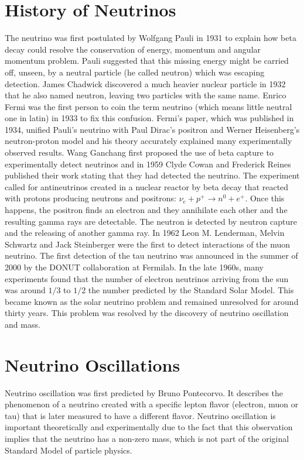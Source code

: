 \section{History of Neutrinos}
The neutrino was first postulated by Wolfgang Pauli in 1931 to explain how beta decay could resolve the conservation of energy, momentum and angular momentum problem. Pauli suggested that this missing energy might be carried off, unseen, by a neutral particle (he called neutron) which was escaping detection. James Chadwick discovered a much heavier nuclear particle in 1932 that he also named neutron, leaving two particles with the same name. Enrico Fermi was the first person to coin the term neutrino (which means little neutral one in latin) in 1933 to fix this confusion. Fermi's paper, which was published in 1934, unified Pauli's neutrino with Paul Dirac's positron and Werner Heisenberg's neutron-proton model and his theory accurately explained many experimentally observed results. Wang Ganchang first proposed the use of beta capture to experimentally detect neutrinos and in 1959 Clyde Cowan and Frederick Reines published their work stating that they had detected the neutrino. The experiment called for antineutrinos created in a nuclear reactor by beta decay that reacted with protons producing neutrons and positrons: $\nu_{e} +p^{+}\rightarrow n^{0} + e^{+}$. Once this happens, the positron finds an electron and they annihilate each other and the resulting gamma rays are detectable. The neutron is detected by neutron capture and the releasing of another gamma ray. In 1962 Leon M. Lenderman, Melvin Schwartz and Jack Steinberger were the first to detect interactions of the muon neutrino. The first detection of the tau neutrino was announced in the summer of 2000 by the DONUT collaboration at Fermilab. In the late 1960s, many experiments found that the number of electron neutrinos arriving from the sun was around $1/3$ to $1/2$ the number predicted by the Standard Solar Model. This became known as the solar neutrino problem and remained unresolved for around thirty years. This problem was resolved by the discovery of neutrino oscillation and mass.\cite{neutrino}


\section{Neutrino Oscillations}
Neutrino oscillation was first predicted by Bruno Pontecorvo. It describes the phenomenon of a neutrino created with a specific lepton flavor (electron, muon or tau) that is later measured to have a different flavor. Neutrino oscillation is important theoretically and experimentally due to the fact that this observation implies that the neutrino has a non-zero mass, which is not part of the original Standard Model of particle physics. \cite{neutrinooscillation} 

